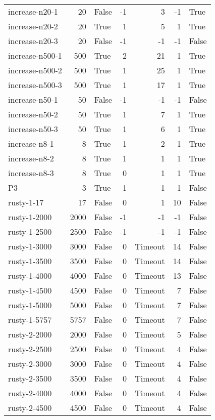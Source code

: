 \begin{longtable}{lrlrrrl}
increase-n20-1 & 20 & False & -1 & 3 & -1 & True \\
increase-n20-2 & 20 & True & 1 & 5 & 1 & True \\
increase-n20-3 & 20 & False & -1 & -1 & -1 & False \\
increase-n500-1 & 500 & True & 2 & 21 & 1 & True \\
increase-n500-2 & 500 & True & 1 & 25 & 1 & True \\
increase-n500-3 & 500 & True & 1 & 17 & 1 & True \\
increase-n50-1 & 50 & False & -1 & -1 & -1 & False \\
increase-n50-2 & 50 & True & 1 & 7 & 1 & True \\
increase-n50-3 & 50 & True & 1 & 6 & 1 & True \\
increase-n8-1 & 8 & True & 1 & 2 & 1 & True \\
increase-n8-2 & 8 & True & 1 & 1 & 1 & True \\
increase-n8-3 & 8 & True & 0 & 1 & 1 & True \\
P3 & 3 & True & 1 & 1 & -1 & False \\
rusty-1-17 & 17 & False & 0 & 1 & 10 & False \\
rusty-1-2000 & 2000 & False & -1 & -1 & -1 & False \\
rusty-1-2500 & 2500 & False & -1 & -1 & -1 & False \\
rusty-1-3000 & 3000 & False & 0 & Timeout & 14 & False \\
rusty-1-3500 & 3500 & False & 0 & Timeout & 14 & False \\
rusty-1-4000 & 4000 & False & 0 & Timeout & 13 & False \\
rusty-1-4500 & 4500 & False & 0 & Timeout & 7 & False \\
rusty-1-5000 & 5000 & False & 0 & Timeout & 7 & False \\
rusty-1-5757 & 5757 & False & 0 & Timeout & 7 & False \\
rusty-2-2000 & 2000 & False & 0 & Timeout & 5 & False \\
rusty-2-2500 & 2500 & False & 0 & Timeout & 4 & False \\
rusty-2-3000 & 3000 & False & 0 & Timeout & 4 & False \\
rusty-2-3500 & 3500 & False & 0 & Timeout & 4 & False \\
rusty-2-4000 & 4000 & False & 0 & Timeout & 4 & False \\
rusty-2-4500 & 4500 & False & 0 & Timeout & 4 & False \\

\end{longtable}
